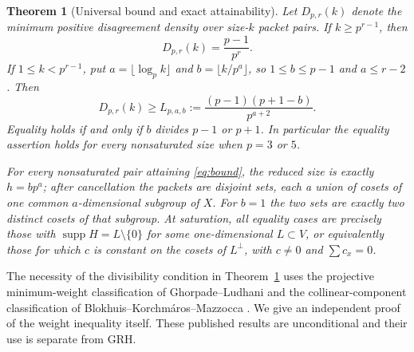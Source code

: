\documentclass[11pt]{article}
\newtheorem{theorem}{Theorem}[section]
\theoremstyle{remark}\newtheorem{remark}[theorem]{Remark}
\newcommand{\supp}{\operatorname{supp}}
\begin{document}
\begin{theorem}[Universal bound and exact attainability]\label{thm:main}
Let $D_{p,r}(k)$ denote the minimum positive disagreement density over size-$k$ packet pairs. If $k\ge p^{r-1}$, then
\begin{equation}\label{eq:sat}
 D_{p,r}(k)=\frac{p-1}{p^r}.
\end{equation}
If $1\le k<p^{r-1}$, put $a=\lfloor\log_p k\rfloor$ and $b=\lfloor k/p^a\rfloor$, so $1\le b\le p-1$ and $a\le r-2$. Then
\begin{equation}\label{eq:bound}
 D_{p,r}(k)\ge L_{p,a,b}:=\frac{(p-1)(p+1-b)}{p^{a+2}}.
\end{equation}
Equality holds if and only if $b$ divides $p-1$ or $p+1$. In particular the equality assertion holds for every nonsaturated size when $p=3$ or $5$.

For every nonsaturated pair attaining \eqref{eq:bound}, the reduced size is exactly $h=bp^a$; after cancellation the packets are disjoint \emph{sets}, each a union of cosets of one common $a$-dimensional subgroup of $X$. For $b=1$ the two sets are exactly two distinct cosets of that subgroup. At saturation, all equality cases are precisely those with $\supp H=L\setminus\{0\}$ for some one-dimensional $L\subset V$, or equivalently those for which $c$ is constant on the cosets of $L^\perp$, with $c\ne0$ and $\sum c_x=0$.
\end{theorem}

The necessity of the divisibility condition in Theorem~\ref{thm:main} uses the projective minimum-weight classification of Ghorpade--Ludhani \cite[Theorem 4.3]{GL} and the collinear-component classification of Blokhuis--Korchm\'aros--Mazzocca \cite[Theorem 5.1 and the discussion following it]{BKM}. We give an independent proof of the weight inequality itself. These published results are unconditional and their use is separate from GRH.
\end{document}
